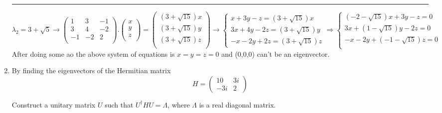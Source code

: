 \documentclass[fleqn]{article}
\begin{document}
\begin{enumerate}
      \textcolor{hwColor}{
        \rule{16cm}{0.4pt}
      }

      \bigbreak

      \textcolor{hwColor}{
        $
        \lambda_2=3+\sqrt{5} \rightarrow
        \begin{pmatrix}
          1 & 3 & -1 \\
          3 & 4 & -2 \\
          -1 & -2 & 2 \\
        \end{pmatrix}.\begin{pmatrix}
          x \\
          y \\
          z \\
        \end{pmatrix}=\begin{pmatrix}
          (3+\sqrt{15})x \\
          (3+\sqrt{15})y \\
          (3+\sqrt{15})z \\
        \end{pmatrix}
        \rightarrow
        \begin{cases}
          x+3y-z=(3+\sqrt{15})x \\
          3x+4y-2z=(3+\sqrt{15})y \\
          -x-2y+2z=(3+\sqrt{15})z
        \end{cases}
        \Longrightarrow
        \begin{cases}
         (-2- \sqrt{15})x+3y-z=0  \\
         3x+(1-\sqrt{15})y-2z=0  \\
         -x-2y+(-1-\sqrt{15})z=0 \\
        \end{cases}
        $ \\
        After doing some ao the above system of equations is $x=y=z=0$ and (0,0,0) can't be an eigenvector.
      }
      
    \item By finding the eigenvectors of the Hermitian matrix
      $$H= 
      \begin{pmatrix}
      10 & 3i \\
      -3i & 2 
      \end{pmatrix}
      $$

      Construct a unitary matrix $U$ such that $U^\dagger HU=\Lambda$, where $\Lambda$ is a real  diagonal matrix.
      

\end{enumerate}
\end{document}
